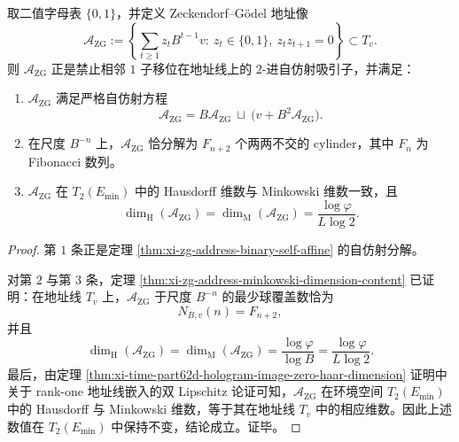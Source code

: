 \begin{theorem}\label{thm:xi-time-part9gb-zg-address-fractal-dimension}
取二值字母表 \(\{0,1\}\)，并定义 Zeckendorf--Gödel 地址像
\[
\mathcal A_{\mathrm{ZG}}
:=
\left\{
\sum_{t\ge 1}z_tB^{t-1}v:\ 
z_t\in\{0,1\},\ z_tz_{t+1}=0
\right\}
\subset T_v.
\]
则 \(\mathcal A_{\mathrm{ZG}}\) 正是禁止相邻 \(1\) 子移位在地址线上的 \(2\)-进自仿射吸引子，并满足：
\begin{enumerate}
  \item \(\mathcal A_{\mathrm{ZG}}\) 满足严格自仿射方程
  \[
  \mathcal A_{\mathrm{ZG}}
  =
  B\mathcal A_{\mathrm{ZG}}
  \ \sqcup\
  \bigl(v+B^2\mathcal A_{\mathrm{ZG}}\bigr).
  \]
  \item 在尺度 \(B^{-n}\) 上，\(\mathcal A_{\mathrm{ZG}}\) 恰分解为 \(F_{n+2}\) 个两两不交的 cylinder，其中 \(F_n\) 为 Fibonacci 数列。
  \item \(\mathcal A_{\mathrm{ZG}}\) 在 \(T_2(E_{\min})\) 中的 Hausdorff 维数与 Minkowski 维数一致，且
  \[
  \dim_{\mathrm H}(\mathcal A_{\mathrm{ZG}})
  =
  \dim_{\mathrm M}(\mathcal A_{\mathrm{ZG}})
  =
  \frac{\log\varphi}{L\log 2}.
  \]
\end{enumerate}
\end{theorem}
\begin{proof}
第 \(1\) 条正是定理 \ref{thm:xi-zg-address-binary-self-affine} 的自仿射分解。

对第 \(2\) 与第 \(3\) 条，定理 \ref{thm:xi-zg-address-minkowski-dimension-content} 已证明：在地址线 \(T_v\) 上，\(\mathcal A_{\mathrm{ZG}}\) 于尺度 \(B^{-n}\) 的最少球覆盖数恰为
\[
N_{B,v}(n)=F_{n+2},
\]
并且
\[
\dim_{\mathrm H}(\mathcal A_{\mathrm{ZG}})
=
\dim_{\mathrm M}(\mathcal A_{\mathrm{ZG}})
=
\frac{\log\varphi}{\log B}
=
\frac{\log\varphi}{L\log 2}.
\]
最后，由定理 \ref{thm:xi-time-part62d-hologram-image-zero-haar-dimension} 证明中关于 rank-one 地址线嵌入的双 Lipschitz 论证可知，\(\mathcal A_{\mathrm{ZG}}\) 在环境空间 \(T_2(E_{\min})\) 中的 Hausdorff 与 Minkowski 维数，等于其在地址线 \(T_v\) 中的相应维数。因此上述数值在 \(T_2(E_{\min})\) 中保持不变，结论成立。证毕。
\end{proof}

